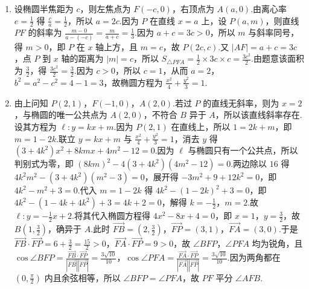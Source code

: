 \begin{solution}
\begin{enumerate}
\item 设椭圆半焦距为 \(c\)，则左焦点为 \(F\left(-c,0\right)\)，右顶点为 \(A\left(a,0\right)\).由离心率 \(e=\frac12\) 得 \(\frac{c}{a}=\frac12\)，所以 \(a=2c\).因为 \(P\) 在直线 \(x=a\) 上，设 \(P\left(a,m\right)\)，则直线 \(PF\) 的斜率为 \(\frac{m-0}{a-\left(-c\right)}=\frac{m}{a+c}=\frac13\).因为 \(a+c=3c>0\)，所以 \(m\) 与斜率同号，得 \(m>0\)，即 \(P\) 在 \(x\) 轴上方，且 \(m=c\)，故 \(P\left(2c,c\right)\).又 \(\left|AF\right|=a+c=3c\)，点 \(P\) 到 \(x\) 轴的距离为 \(\left|m\right|=c\)，所以 \(S_{\triangle PFA}=\frac12\times 3c\times c=\frac{3c^2}{2}\).由题意该面积为 \(\frac32\)，得 \(\frac{3c^2}{2}=\frac32\).因为 \(c>0\)，所以 \(c=1\)，从而 \(a=2\)，\(b^2=a^2-c^2=4-1=3\)，故椭圆方程为 \(\frac{x^2}{4}+\frac{y^2}{3}=1\).
\item 由上问知 \(P\left(2,1\right)\)，\(F\left(-1,0\right)\)，\(A\left(2,0\right)\).若过 \(P\) 的直线无斜率，则为 \(x=2\)，与椭圆的唯一公共点为 \(A\left(2,0\right)\)，不符合 \(B\) 异于 \(A\)，所以该直线斜率存在.设其方程为 \(\ell:y=kx+m\).因为 \(P\left(2,1\right)\) 在直线上，所以 \(1=2k+m\)，即 \(m=1-2k\).联立 \(y=kx+m\) 与 \(\frac{x^2}{4}+\frac{y^2}{3}=1\)，消去 \(y\) 得 \(\left(3+4k^2\right)x^2+8kmx+4m^2-12=0\).因为 \(\ell\) 与椭圆只有一个公共点，所以判别式为零，即 \(\left(8km\right)^2-4\left(3+4k^2\right)\left(4m^2-12\right)=0\).两边除以 \(16\) 得 \(4k^2m^2-\left(3+4k^2\right)\left(m^2-3\right)=0\)，展开得 \(-3m^2+9+12k^2=0\)，即 \(4k^2-m^2+3=0\).代入 \(m=1-2k\) 得 \(4k^2-\left(1-2k\right)^2+3=0\)，即 \(4k^2-\left(1-4k+4k^2\right)+3=4k+2=0\)，解得 \(k=-\frac12\)，\(m=2\).故 \(\ell:y=-\frac12x+2\).将其代入椭圆方程得 \(4x^2-8x+4=0\)，即 \(x=1\)，\(y=\frac32\)，故 \(B\left(1,\frac32\right)\)，确异于 \(A\).此时 \(\overrightarrow{FB}=\left(2,\frac32\right)\)，\(\overrightarrow{FP}=\left(3,1\right)\)，\(\overrightarrow{FA}=\left(3,0\right)\).于是 \(\overrightarrow{FB}\cdot\overrightarrow{FP}=6+\frac32=\frac{15}{2}>0\)，\(\overrightarrow{FA}\cdot\overrightarrow{FP}=9>0\)，故 \(\angle BFP\)，\(\angle PFA\) 均为锐角，且 \(\cos\angle BFP=\frac{\overrightarrow{FB}\cdot\overrightarrow{FP}}{\left|\overrightarrow{FB}\right|\left|\overrightarrow{FP}\right|}=\frac{3\sqrt{10}}{10}\)，\(\cos\angle PFA=\frac{\overrightarrow{FA}\cdot\overrightarrow{FP}}{\left|\overrightarrow{FA}\right|\left|\overrightarrow{FP}\right|}=\frac{3\sqrt{10}}{10}\).因为两角都在 \(\left(0,\frac{\pi}{2}\right)\) 内且余弦相等，所以 \(\angle BFP=\angle PFA\)，故 \(PF\) 平分 \(\angle AFB\).
\end{enumerate}
\end{solution}


